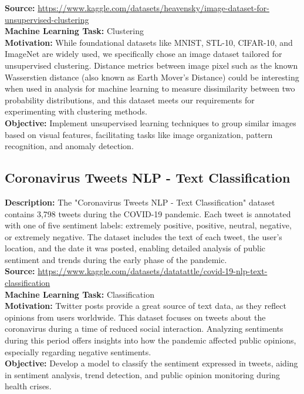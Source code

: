 \documentclass{article}
\begin{document}
\textbf{Source:} \href{https://www.kaggle.com/datasets/heavensky/image-dataset-for-unsupervised-clustering}{https://www.kaggle.com/datasets/heavensky/image-dataset-for-unsupervised-clustering} \\


\textbf{Machine Learning Task:} Clustering \\

\textbf{Motivation:} While foundational datasets like MNIST, STL-10, CIFAR-10, and ImageNet are widely used, we specifically chose an image dataset tailored for unsupervised clustering. Distance metrics between image pixel such as the known Wasserstien distance (also known as Earth Mover’s Distance) could be interesting when used in analysis for machine learning to measure dissimilarity between two probability distributions, and this dataset meets our requirements for experimenting with clustering methods. \\

\textbf{Objective:} Implement unsupervised learning techniques to group similar images based on visual features, facilitating tasks like image organization, pattern recognition, and anomaly detection.

\subsection{Coronavirus Tweets NLP - Text Classification}
\textbf{Description:} The "Coronavirus Tweets NLP - Text Classification" dataset contains 3,798 tweets during the COVID-19 pandemic. Each tweet is annotated with one of five sentiment labels: extremely positive, positive, neutral, negative, or extremely negative. The dataset includes the text of each tweet, the user's location, and the date it was posted, enabling detailed analysis of public sentiment and trends during the early phase of the pandemic. \\

\textbf{Source:}
\href{https://www.kaggle.com/datasets/datatattle/covid-19-nlp-text-classification}{https://www.kaggle.com/datasets/datatattle/covid-19-nlp-text-classification} \\


\textbf{Machine Learning Task:} Classification \\

\textbf{Motivation:} Twitter posts provide a great source of text data, as they reflect opinions from users worldwide. This dataset focuses on tweets about the coronavirus during a time of reduced social interaction. Analyzing sentiments during this period offers insights into how the pandemic affected public opinions, especially regarding negative sentiments. \\


\textbf{Objective:} Develop a model to classify the sentiment expressed in tweets, aiding in sentiment analysis, trend detection, and public opinion monitoring during health crises.
\end{document}

